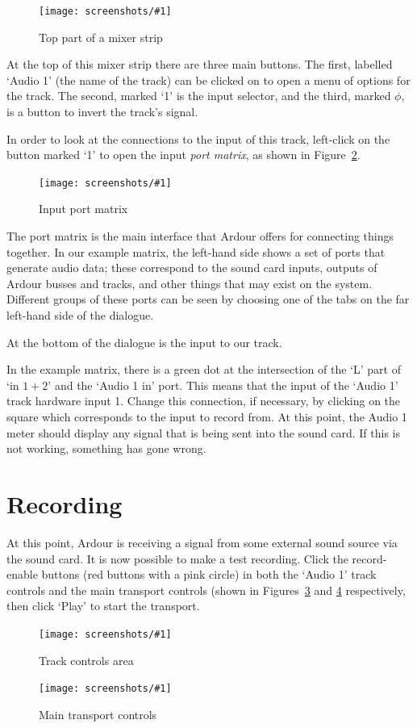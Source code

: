 \documentclass[10pt,a4paper]{book}
\newcommand{\screenshot}[3]{%
\begin{figure}[ht]%
\begin{center}
\texttt{[image: screenshots/\#1]}
\end{center}
\caption{#2}
\label{#3}
\end{figure}}
\begin{document}
\screenshot{top-of-mixer-strip.png}{Top part of a mixer strip}{fig:top-of-mixer-strip}

At the top of this mixer strip there are three main buttons.  The
first, labelled `Audio 1' (the name of the track) can be clicked on to
open a menu of options for the track.  The second, marked `1' is the
input selector, and the third, marked $\phi$, is a button to invert
the track's signal.

In order to look at the connections to the input of this track,
left-click on the button marked `1' to open the input \emph{port
  matrix}, as shown in Figure~\ref{fig:input-port-matrix}.

\screenshot{input-port-matrix.png}{Input port matrix}{fig:input-port-matrix}

The port matrix is the main interface that Ardour offers for
connecting things together.  In our example matrix, the left-hand side
shows a set of ports that generate audio data; these correspond to the
sound card inputs, outputs of Ardour busses and tracks, and other
things that may exist on the system.  Different groups of these ports
can be seen by choosing one of the tabs on the far left-hand side of
the dialogue.

At the bottom of the dialogue is the input to our track.

In the example matrix, there is a green dot at the intersection of the
`L' part of `in $1+2$' and the `Audio 1 in' port.  This means that the
input of the `Audio 1' track hardware input 1.  Change this
connection, if necessary, by clicking on the square which corresponds
to the input to record from.  At this point, the Audio 1 meter should
display any signal that is being sent into the sound card.  If this is
not working, something has gone wrong.

\section{Recording}

At this point, Ardour is receiving a signal from some external sound
source via the sound card.  It is now possible to make a test
recording.  Click the record-enable buttons (red buttons with a pink
circle) in both the `Audio 1' track controls and the main transport
controls (shown in Figures~\ref{fig:track-controls} and
\ref{fig:transport-controls} respectively, then click `Play' to start
the transport.

\screenshot{track-controls.png}{Track controls area}{fig:track-controls}
\screenshot{transport-controls.png}{Main transport controls}{fig:transport-controls}
\end{document}

